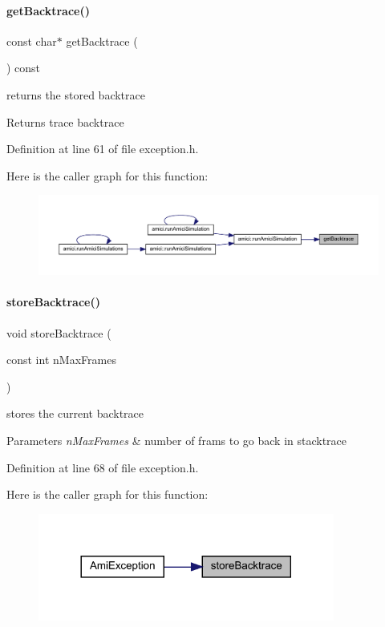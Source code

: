\paragraph{\texorpdfstring{getBacktrace()}{getBacktrace()}}
{\footnotesize\ttfamily const char$\ast$ get\+Backtrace (\begin{DoxyParamCaption}{ }\end{DoxyParamCaption}) const}

returns the stored backtrace \begin{DoxyReturn}{Returns}
trace backtrace 
\end{DoxyReturn}


Definition at line 61 of file exception.\+h.

Here is the caller graph for this function\+:
\nopagebreak
\begin{figure}[H]
\begin{center}
\leavevmode
\includegraphics[width=350pt]{classamici_1_1_ami_exception_abd4eec3294e3af56ff54130ca3f2dea9_icgraph}
\end{center}
\end{figure}
\mbox{\label{classamici_1_1_ami_exception_a795d2a9009cbc53d5a602e621a3a6450}} 
\paragraph{\texorpdfstring{storeBacktrace()}{storeBacktrace()}}
{\footnotesize\ttfamily void store\+Backtrace (\begin{DoxyParamCaption}\item[{const int}]{n\+Max\+Frames }\end{DoxyParamCaption})}

stores the current backtrace 
\begin{DoxyParams}{Parameters}
{\em n\+Max\+Frames} & number of frams to go back in stacktrace \\
\hline
\end{DoxyParams}


Definition at line 68 of file exception.\+h.

Here is the caller graph for this function\+:
\nopagebreak
\begin{figure}[H]
\begin{center}
\leavevmode
\includegraphics[width=276pt]{classamici_1_1_ami_exception_a795d2a9009cbc53d5a602e621a3a6450_icgraph}
\end{center}
\end{figure}
